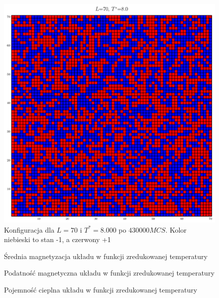 \documentclass[11pt]{article}
\begin{document}
\begin{figure}
    \centering
    \includegraphics[width=\textwidth]{lattice_L70_T8.png}
    \caption{Konfiguracja dla $L=70$ i $T^* = 8.000$ po $430 000 MCS$. 
    Kolor niebieski to stan -1, a czerwony +1}
\end{figure}
%     
\begin{figure}
    \centering
    
    \caption{Średnia magnetyzacja układu w funkcji zredukowanej temperatury}
\end{figure}
\begin{figure}
    \centering
    
    \caption{Podatność magnetyczna układu w funkcji zredukowanej temperatury}
\end{figure}
\begin{figure}
    \centering
    
    \caption{Pojemność cieplna układu w funkcji zredukowanej temperatury}
\end{figure}

\newpage
\end{document}
